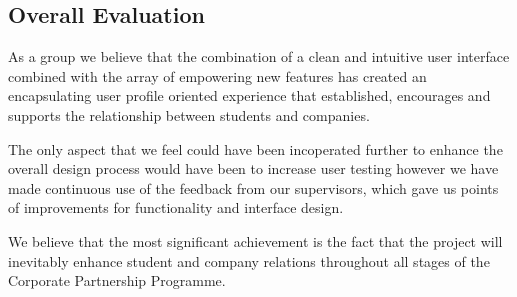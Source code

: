 \subsection{Overall Evaluation}
  As a group we believe that the combination of a clean and intuitive user interface combined with the array of empowering new features has created an encapsulating user profile oriented experience that established, encourages and supports the relationship between students and companies.

  The only aspect that we feel could have been incoperated further to enhance the overall design process would have been to increase user testing however we have made continuous use of the feedback from our supervisors, which gave us points of improvements for functionality and interface design.
  
  We believe that the most significant achievement is the fact that the project will inevitably enhance student and company relations throughout all stages of the Corporate Partnership Programme.
